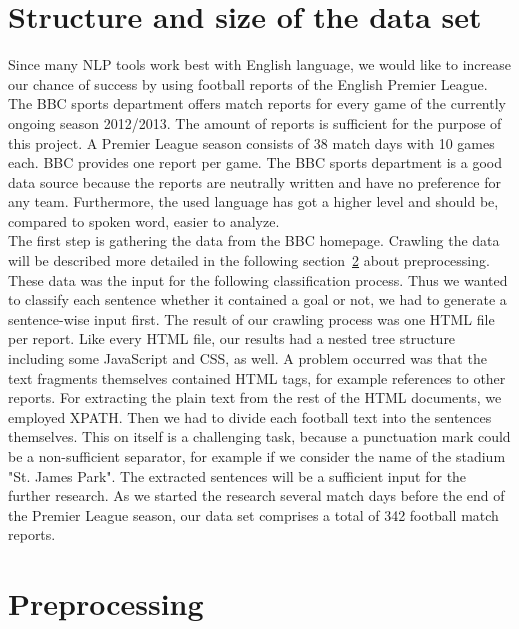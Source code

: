 \documentclass[11pt,titlepage,oneside,openany]{book}
\begin{document}
\section{Structure and size of the data set}
\label{sec:structure}

Since many NLP tools work best with English language, we would like to increase our chance of success by using football reports of the English Premier League. The BBC sports department offers match reports for every game of the currently ongoing season 2012/2013. The amount of reports is sufficient for the purpose of this project. A Premier League season consists of 38 match days with 10 games each. BBC provides one report per game. The BBC sports department is a good data source because the reports are neutrally written and have no preference for any team. Furthermore, the used language has got a higher level and should be, compared to spoken word, easier to analyze. \\

The first step is gathering the data from the BBC homepage. Crawling the data will be described more detailed in the following section~\ref{sec:preproc} about preprocessing. These data was the input for the following classification process. Thus we wanted to classify each sentence whether it contained a goal or not, we had to generate a sentence-wise input first.  The result of our crawling process was one HTML file per report. Like every HTML file, our results had a nested tree structure including some JavaScript and CSS, as well. A problem occurred was that the text fragments themselves contained HTML tags, for example references to other reports. For extracting the plain text from the rest of the HTML documents, we employed XPATH. Then we had to divide each football text into the sentences themselves. This on itself is a challenging task, because a punctuation mark could be a non-sufficient separator, for example if we consider the name of the stadium "St. James Park". The extracted sentences will be a sufficient input for the further research. As we started the research several match days before the end of the Premier League season, our data set comprises a total of 342 football match reports.

\section{Preprocessing}
\label{sec:preproc}
\end{document}

